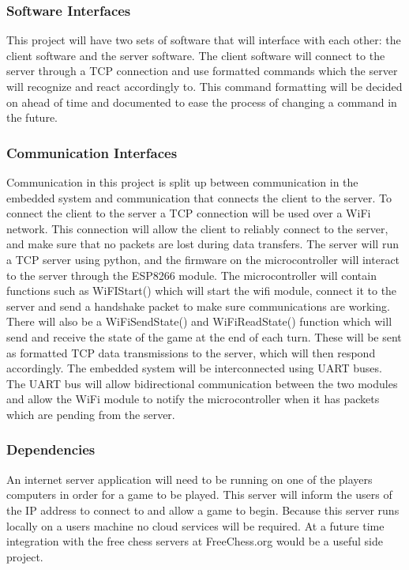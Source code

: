 \documentclass{article}
\begin{document}
\subsubsection*{Software Interfaces}
\indent

This project will have two sets of software that will interface with each other: the client software and the server software. The client software will connect to the server through a TCP connection and use formatted commands which the server will recognize and react accordingly to. This command formatting will be decided on ahead of time and documented to ease the process of changing a command in the future.

\subsubsection*{Communication Interfaces}
\indent

Communication in this project is split up between communication in the embedded system and communication that connects the client to the server. To connect the client to the server a TCP connection will be used over a WiFi network. This connection will allow the client to reliably connect to the server, and make sure that no packets are lost during data transfers. The server will run a TCP server using python, and the firmware on the microcontroller will interact to the server through the ESP8266 module. The microcontroller will contain functions such as WiFIStart() which will start the wifi module, connect it to the server and send a handshake packet to make sure communications are working. There will also be a WiFiSendState() and WiFiReadState() function which will send and receive the state of the game at the end of each turn. These will be sent as formatted TCP data transmissions to the server, which will then respond accordingly. The embedded system will be interconnected using UART buses. The UART bus will allow bidirectional communication between the two modules and allow the WiFi module to notify the microcontroller when it has packets which are pending from the server.

\subsubsection*{Dependencies}
\indent

An internet server application will need to be running on one of the players computers in order for a game to be played. This server will inform the users of the IP address to connect to and allow a game to begin. Because this server runs locally on a users machine no cloud services will be required. At a future time integration with the free chess servers at FreeChess.org would be a useful side project.
\end{document}
